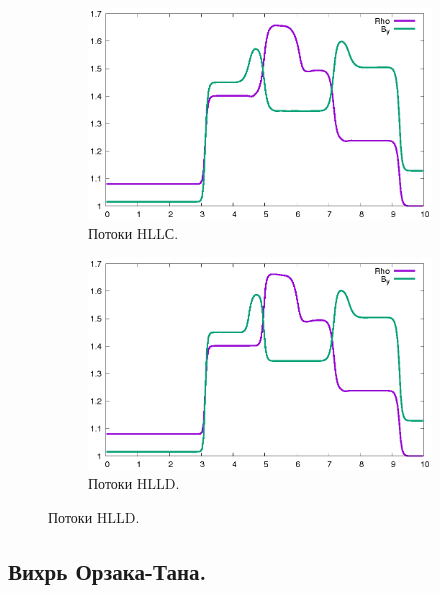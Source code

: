 \documentclass[14pt, a4paper, fleqn]{extreport}
\begin{document}
    \begin{figure}[H]
        \centering
        \caption{$\rho$ и $B_y$ при $t = 1800\tau$.}
        \begin{subfigure}{0.75\textwidth}
            \centering
            \caption{Потоки HLLС.}
            \includegraphics[width=\textwidth]{1D_HLLC.eps}
        \end{subfigure}
        \begin{subfigure}{0.75\textwidth}
            \centering
            \caption{Потоки HLLD.}
            \includegraphics[width=\textwidth]{1D_HLLD.eps}
        \end{subfigure}
    \end{figure}

    \subsection{Вихрь Орзака-Тана.}
\end{document}
